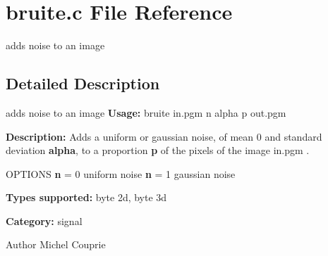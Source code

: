 \section{bruite.c File Reference}
\label{bruite_8c}


adds noise to an image  




\subsection{Detailed Description}
adds noise to an image {\bfseries Usage:} bruite in.pgm n alpha p out.pgm

{\bfseries Description:} Adds a uniform or gaussian noise, of mean 0 and standard deviation {\bfseries alpha}, to a proportion {\bfseries p} of the pixels of the image in.pgm .

OPTIONS {\bfseries n} = 0 uniform noise {\bfseries n} = 1 gaussian noise

{\bfseries Types supported:} byte 2d, byte 3d

{\bfseries Category:} signal

\begin{DoxyAuthor}{Author}
Michel Couprie 
\end{DoxyAuthor}

